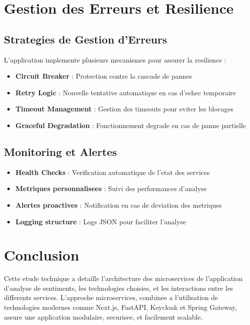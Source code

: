 \section{Gestion des Erreurs et Resilience}

\subsection{Strategies de Gestion d'Erreurs}

L'application implemente plusieurs mecanismes pour assurer la resilience :

\begin{itemize}
    \item \textbf{Circuit Breaker} : Protection contre la cascade de pannes
    \item \textbf{Retry Logic} : Nouvelle tentative automatique en cas d'echec temporaire
    \item \textbf{Timeout Management} : Gestion des timeouts pour eviter les blocages
    \item \textbf{Graceful Degradation} : Fonctionnement degrade en cas de panne partielle
\end{itemize}

\subsection{Monitoring et Alertes}

\begin{itemize}
    \item \textbf{Health Checks} : Verification automatique de l'etat des services
    \item \textbf{Metriques personnalisees} : Suivi des performances d'analyse
    \item \textbf{Alertes proactives} : Notification en cas de deviation des metriques
    \item \textbf{Logging structure} : Logs JSON pour faciliter l'analyse
\end{itemize}

\section{Conclusion}

Cette etude technique a detaille l'architecture des microservices de l'application d'analyse de sentiments, les technologies choisies, et les interactions entre les differents services. L'approche microservices, combinee a l'utilisation de technologies modernes comme Next.js, FastAPI, Keycloak et Spring Gateway, assure une application modulaire, securisee, et facilement scalable.

